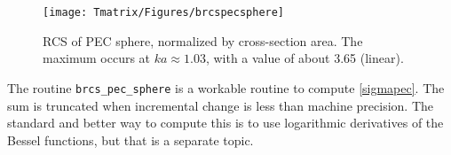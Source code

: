 %
%
%
%
%
%
%
%
%
%
%
%
%
%


%
%
%
%


\begin{figure}[H] 
   \centering
   \texttt{[image: Tmatrix/Figures/brcspecsphere]} 
   \caption{RCS of PEC sphere, normalized by cross-section area.  The maximum occurs at $ka \approx 1.03$, with a value of about 3.65 (linear).}
\end{figure}


The routine \texttt{brcs\_pec\_sphere} is a workable routine to compute \eqref{sigmapec}. The sum is truncated when incremental change is less than machine precision. The standard and better way to compute this is to use logarithmic derivatives of the Bessel functions, but that is a separate topic.

